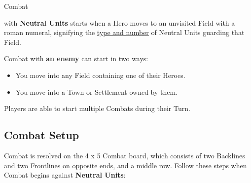 
\begin{multicols}{2}

\hypertarget{Combat}{Combat} with \textbf{Neutral Units} starts when a Hero moves to an unvisited Field with a roman numeral, signifying the \hyperlink{Difficulty}{type and number} of Neutral Units guarding that Field.

Combat with \textbf{an enemy} can start in two ways:
\begin{itemize}
  \item You move into any Field containing one of their Heroes.
  \item You move into a Town or Settlement owned by them.
\end{itemize}
Players are able to start multiple Combats during their Turn.

\subsection*{\hypertarget{Combatsetup}{Combat Setup}}

Combat is resolved on the 4 x 5 Combat board, which consists of two Backlines and two Frontlines on opposite ends, and a middle row.
Follow these steps when Combat begins against \textbf{Neutral Units}:


\end{multicols}
